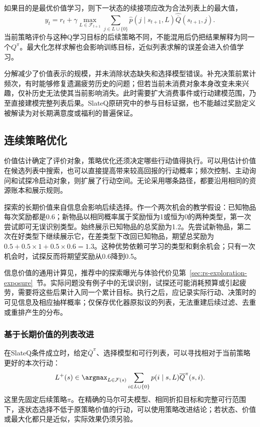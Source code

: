 如果目的是最优价值学习，则下一状态的续接项应改为合法列表上的最大值，
\[
 y_t=r_t+\gamma\max_{L\in\mathcal{F}_{t+1}}
 \sum_{j\in L\cup\{0\}}
 \widehat p(j\mid s_{t+1},L)
 \widehat{\overline Q}(s_{t+1},j).
\]
当前策略评价与这种Q学习目标的后续策略不同，不能混用后仍把结果解释为同一个$Q^\pi$。最大化怎样求解也会影响训练目标，近似列表求解的误差会进入价值学习。

分解减少了价值表示的规模，并未消除状态缺失和选择模型错误。补充决策前累计频次，有时能够修复遗漏疲劳历史的问题；但若当前未消费对象本身改变未来兴趣，仅补历史无法使其当前影响消失。此时需要扩大消费事件或行动建模范围，乃至直接建模完整列表后果。SlateQ原研究中的参与目标证据，也不能越过奖励定义被解读为对长期满意度或福利的普遍保证。

\subsection{连续策略优化}
\label{sec:rs-sequential-policy}

价值估计确定了评价对象，策略优化还须决定哪些行动值得执行。可以用估计价值在候选列表中搜索，也可以直接提高带来较高回报的行动概率；频次控制、主动询问和试探冷启动对象，则扩展了行动空间。无论采用哪条路径，都要沿用相同的资源账本和展示规则。

探索的长期价值来自信息会影响后续选择。作一个两次机会的教学假设：已知物品每次奖励都是0.6；新物品以相同概率属于奖励恒为1或恒为0的两种类型，第一次尝试即可无误识别类型。始终展示已知物品的总奖励为1.2。先尝试新物品，第二次在好类型下继续展示它，在差类型下改回已知物品，期望总奖励为$0.5+0.5\times1+0.5\times0.6=1.3$。这种优势依赖可学习的类型和剩余机会；只有一次机会时，试探反而将期望奖励从0.6降到0.5。

信息价值的通用计算见，推荐中的探索曝光与体验代价见第~\ref{sec:rs-exploration-exposure}~节。实际问题没有例子中的无误识别，试探还可能消耗预算或引起疲劳，需要将这些后果计入同一个累计目标。执行之后，应记录实际行动、决策时的可见信息及相应抽样概率；仅保存优化器原拟议的列表，无法重建后续过滤、去重或重排产生的分布。

\subsubsection{基于长期价值的列表改进}
\label{sec:rs-long-term-slate-improvement}

在SlateQ条件成立时，给定$\overline Q^\pi$、选择模型和可行列表，可以寻找相对于当前策略更好的本次行动：
\begin{equation}
 L^+(s)\in\argmax_{L\in\mathcal{F}(s)}
 \sum_{i\in L\cup\{0\}}
 p(i\mid s,L)\overline Q^\pi(s,i).
 \label{eq:rs-long-term-slate-improvement}
\end{equation}
这里先固定后续策略$\pi$。在精确的马尔可夫模型、相同折扣目标和完整可行范围下，逐状态选择不低于原策略价值的行动，可以使用策略改进结论；若状态、价值或最大化都只是近似，实际效果仍须另验。

